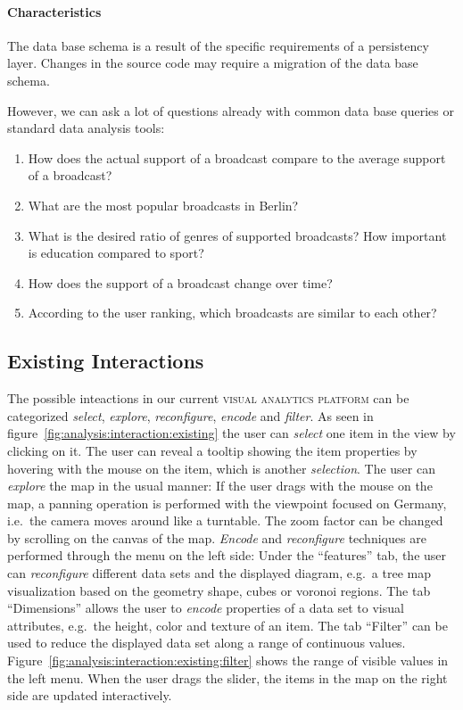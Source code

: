 \documentclass{article}
\newcommand{\visan}{\textsc{visual analytics platform}}
\begin{document}
\paragraph{Characteristics}
The data base schema is a result of the specific requirements of a persistency layer.
Changes in the source code may require a migration of the data base schema.

However, we can ask a lot of questions already with common data base queries or standard data analysis tools:
\begin{enumerate}
  \item
    How does the actual support of a broadcast compare to the average support of a broadcast?
  \item
    What are the most popular broadcasts in Berlin?
  \item
    What is the desired ratio of genres of supported broadcasts? How important is education compared to sport?
  \item
    How does the support of a broadcast change over time?
  \item
    According to the user ranking, which broadcasts are similar to each other?
\end{enumerate}


\subsection{Existing Interactions}
The possible inteactions in our current \visan{} can be categorized \emph{select}, \emph{explore}, \emph{reconfigure}, \emph{encode} and \emph{filter}.
As seen in figure~\ref{fig:analysis:interaction:existing} the user can \emph{select} one item in the view by clicking on it.
The user can reveal a tooltip showing the item properties by hovering with the mouse on the item, which is another \emph{selection}.
The user can \emph{explore} the map in the usual manner:
If the user drags with the mouse on the map, a panning operation is performed with the viewpoint focused on Germany, i.e.\ the camera moves around like a turntable.
The zoom factor can be changed by scrolling on the canvas of the map.
\emph{Encode} and \emph{reconfigure} techniques are performed through the menu on the left side:
Under the ``features'' tab, the user can \emph{reconfigure} different data sets and the displayed diagram, e.g.\ a tree map visualization based on the geometry shape, cubes or voronoi regions.
The tab ``Dimensions'' allows the user to \emph{encode} properties of a data set to visual attributes, e.g.\ the height, color and texture of an item.
The tab ``Filter'' can be used to reduce the displayed data set along a range of continuous values.
Figure~\ref{fig:analysis:interaction:existing:filter} shows the range of visible values in the left menu.
When the user drags the slider, the items in the map on the right side are updated interactively.
\end{document}

